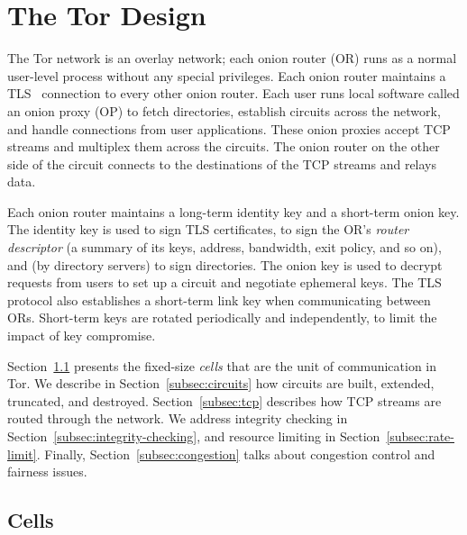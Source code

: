 \documentclass[twocolumn]{article}
\begin{document}

\section{The Tor Design}
\label{sec:design}

The Tor network is an overlay network; each onion router (OR)
runs as a normal
user-level process without any special privileges.
Each onion router maintains a TLS~\cite{TLS}
connection to every other onion router.
Each user
runs local software called an onion proxy (OP) to fetch directories,
establish circuits across the network,
and handle connections from user applications.  These onion proxies accept
TCP streams and multiplex them across the circuits. The onion
router on the other side
of the circuit connects to the destinations of
the TCP streams and relays data.

Each onion router maintains a long-term identity key and a short-term
onion key. The identity
key is used to sign TLS certificates, to sign the OR's \emph{router
descriptor} (a summary of its keys, address, bandwidth, exit policy,
and so on), and (by directory servers) to sign directories. %
The onion key is used to decrypt requests
from users to set up a circuit and negotiate ephemeral keys. 
The TLS protocol also establishes a short-term link key when communicating
between ORs. Short-term keys are rotated periodically and
independently, to limit the impact of key compromise.

Section~\ref{subsec:cells} presents the fixed-size
\emph{cells} that are the unit of communication in Tor. We describe
in Section~\ref{subsec:circuits} how circuits are
built, extended, truncated, and destroyed. Section~\ref{subsec:tcp}
describes how TCP streams are routed through the network.  We address
integrity checking in Section~\ref{subsec:integrity-checking},
and resource limiting in Section~\ref{subsec:rate-limit}.
Finally,
Section~\ref{subsec:congestion} talks about congestion control and
fairness issues.

\subsection{Cells}
\label{subsec:cells}
\end{document}

